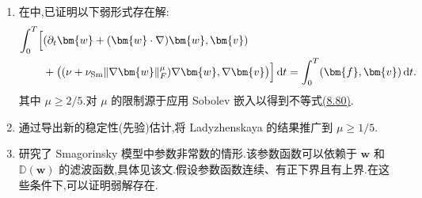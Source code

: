 \begin{note}[推广]
\label{note:smagorinsky-existence-generalizations}
\begin{enumerate}
 \item 在\textcite{Ladyzhenskaya1967}中,已证明以下弱形式存在解:
 \[
 \begin{aligned}
  \int_0^T\Bigl[&(\partial_t\bm{w}
       +(\bm{w}\cdot\nabla)\bm{w},\bm{v})\\
   &+\bigl((\nu+\nu_{\mathrm{Sm}}\|\nabla\bm{w}\|_F^{\mu})
                    \nabla\bm{w},\nabla\bm{v}\bigr)\Bigr]\,\mathrm{d}t
   =\int_0^T(\bm{f},\bm{v})\,\mathrm{d}t.
 \end{aligned}
 \]
  其中 $\mu\ge2/5$.对 $\mu$ 的限制源于应用 Sobolev 嵌入以得到不等式\hyperref[eq:smagorinsky-convection-bound]{(8.80)}.
 \item \textcite{DuGunzburger1991}通过导出新的稳定性(先验)估计,将 Ladyzhenskaya 的结果推广到 $\mu\ge1/5$.
 \item \textcite{Swierczewska2006}研究了 Smagorinsky 模型中参数非常数的情形.该参数函数可以依赖于 $\bm{w}$ 和 $\mathbb{D}(\bm{w})$ 的滤波函数,具体见该文.假设参数函数连续、有正下界且有上界.在这些条件下,可以证明弱解存在.
\end{enumerate}
\end{note}

